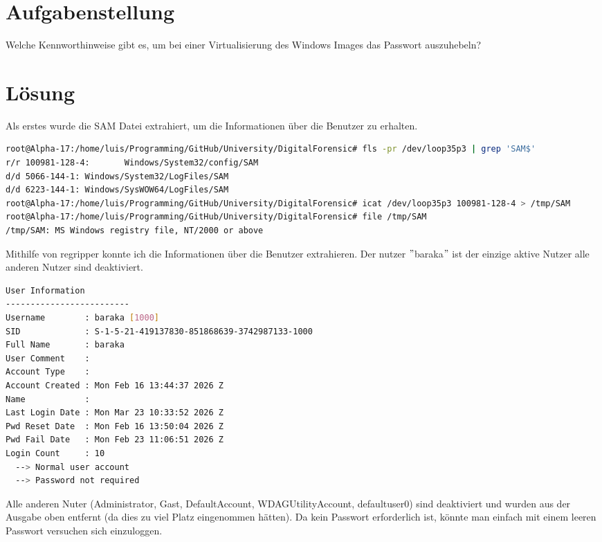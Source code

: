 \section*{Aufgabenstellung}
Welche Kennworthinweise gibt es, um bei einer Virtualisierung des Windows Images das Passwort auszuhebeln?

\section*{Lösung}

Als erstes wurde die SAM Datei extrahiert, um die Informationen über die Benutzer zu erhalten.
\begin{lstlisting}[language=bash]
root@Alpha-17:/home/luis/Programming/GitHub/University/DigitalForensic# fls -pr /dev/loop35p3 | grep 'SAM$'
r/r 100981-128-4:       Windows/System32/config/SAM
d/d 5066-144-1: Windows/System32/LogFiles/SAM
d/d 6223-144-1: Windows/SysWOW64/LogFiles/SAM
root@Alpha-17:/home/luis/Programming/GitHub/University/DigitalForensic# icat /dev/loop35p3 100981-128-4 > /tmp/SAM
root@Alpha-17:/home/luis/Programming/GitHub/University/DigitalForensic# file /tmp/SAM
/tmp/SAM: MS Windows registry file, NT/2000 or above
\end{lstlisting}

Mithilfe von regripper konnte ich die Informationen über die Benutzer extrahieren.
Der nutzer \("\)baraka\("\) ist der einzige aktive Nutzer alle anderen Nutzer sind deaktiviert.

\begin{lstlisting}[language=bash]
User Information
-------------------------
Username        : baraka [1000]
SID             : S-1-5-21-419137830-851868639-3742987133-1000
Full Name       : baraka
User Comment    :
Account Type    :
Account Created : Mon Feb 16 13:44:37 2026 Z
Name            :
Last Login Date : Mon Mar 23 10:33:52 2026 Z
Pwd Reset Date  : Mon Feb 16 13:50:04 2026 Z
Pwd Fail Date   : Mon Feb 23 11:06:51 2026 Z
Login Count     : 10
  --> Normal user account
  --> Password not required
\end{lstlisting}

Alle anderen Nuter (Administrator, Gast, DefaultAccount, WDAGUtilityAccount, defaultuser0) sind deaktiviert und wurden aus der Ausgabe oben entfernt (da dies zu viel Platz eingenommen hätten).
Da kein Passwort erforderlich ist, könnte man einfach mit einem leeren Passwort versuchen sich einzuloggen.
